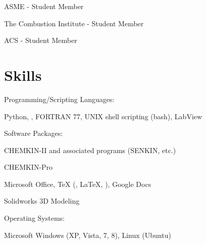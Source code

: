 ASME - Student Member

The Combustion Institute - Student Member

ACS - Student Member


\section{Skills}
Programming/Scripting Languages:
%
\begin{innerlist}
    \item Python, \Matlab, FORTRAN 77, UNIX shell scripting (bash), LabView
\end{innerlist}

\halfblankline

Software Packages:
%
\begin{innerlist}
    \item CHEMKIN-II and associated programs (SENKIN, etc.)
    \item CHEMKIN-Pro
    \item Microsoft Office, \TeX{} (\XeLaTeX{}, \LaTeX{}, \BibTeX{}),
          Google Docs
    \item Solidworks 3D Modeling
\end{innerlist}

\halfblankline

Operating Systems:
%
\begin{innerlist}
    \item Microsoft Windows (XP, Vista, 7, 8), Linux (Ubuntu)
\end{innerlist}





